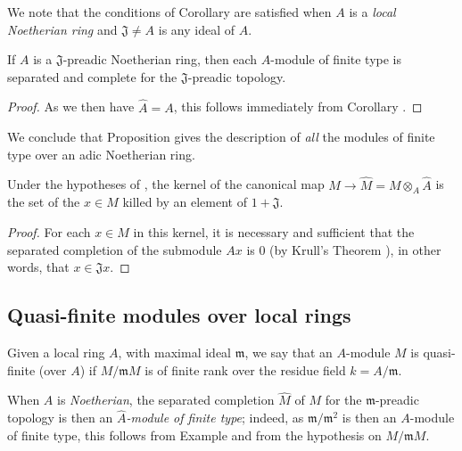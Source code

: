 We note that the conditions of Corollary  are satisfied
when $A$ is a \emph{local Noetherian ring} and $\mathfrak{J}\neq A$ is any ideal of $A$.

\begin{corollary}[7.3.6]
\label{0.7.3.6}
If $A$ is a $\mathfrak{J}$-preadic Noetherian ring, then each $A$-module of finite type
is separated and complete for the $\mathfrak{J}$-preadic topology.
\end{corollary}

\begin{proof}
\label{proof-0.7.3.6}
As we then have $\widehat{A}=A$, this follows immediately from
Corollary .
\end{proof}

We conclude that Proposition  gives the description of
\emph{all} the modules of finite type over an adic Noetherian ring.

\begin{corollary}[7.3.7]
\label{0.7.3.7}
Under the hypotheses of , the kernel of the canonical map
$M\to\widehat{M}=M\otimes_A\widehat{A}$ is the set of the $x\in M$ killed by an element of
$1+\mathfrak{J}$.
\end{corollary}

\begin{proof}
\label{proof-0.7.3.7}
For each $x\in M$ in this kernel, it is necessary and sufficient that the separated
completion of the submodule $Ax$ is $0$
(by Krull's Theorem ), in other words, that
$x\in\mathfrak{J}x$.
\end{proof}

\subsection{Quasi-finite modules over local rings}
\label{subsection:0.7.4}

\begin{definition}[7.4.1]
\label{0.7.4.1}
Given a local ring $A$, with maximal ideal $\mathfrak{m}$, we say that an $A$-module $M$
is quasi-finite (over $A$) if $M/\mathfrak{m}M$ is of finite rank over the residue field
$k=A/\mathfrak{m}$.
\end{definition}

When $A$ is \emph{Noetherian}, the separated completion $\widehat{M}$ of $M$ for the
$\mathfrak{m}$-preadic topology is then an \emph{$\widehat{A}$-module of finite type};
indeed, as $\mathfrak{m}/\mathfrak{m}^2$ is then an $A$-module of finite type, this follows
from Example  and from the hypothesis on $M/\mathfrak{m}M$.

